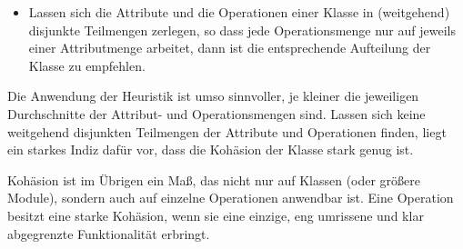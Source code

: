 \begin{itemize}
	\item Lassen sich die Attribute und die Operationen einer Klasse in (weitgehend) disjunkte Teilmengen zerlegen, so dass jede Operationsmenge nur auf jeweils einer Attributmenge arbeitet, dann ist die entsprechende Aufteilung der Klasse zu empfehlen.
\end{itemize}

Die Anwendung der Heuristik ist umso sinnvoller, je kleiner die jeweiligen Durchschnitte der Attribut- und Operationsmengen sind. Lassen sich keine weitgehend disjunkten Teilmengen der Attribute und Operationen finden, liegt ein starkes Indiz dafür vor, dass die Kohäsion der Klasse stark genug ist.

Kohäsion ist im Übrigen ein Maß, das nicht nur auf Klassen (oder größere Module), sondern auch auf einzelne Operationen anwendbar ist. Eine Operation besitzt eine starke Kohäsion, wenn sie eine einzige, eng umrissene und klar abgegrenzte Funktionalität erbringt.